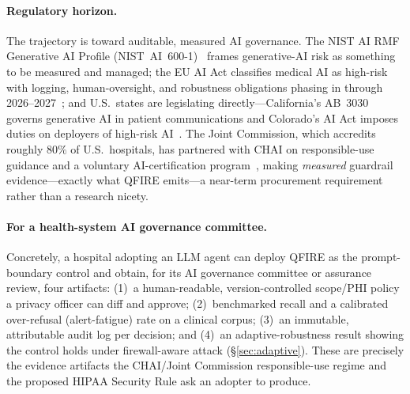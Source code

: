 \documentclass[11pt]{article}
\newcommand{\rev}[1]{#1}
\begin{document}
\paragraph{\rev{Regulatory horizon.}}
\rev{The trajectory is toward auditable, measured AI governance. The NIST AI RMF
Generative AI Profile (NIST~AI~600-1)~\cite{nist_genai2024} frames generative-AI
risk as something to be measured and managed; the EU AI Act classifies medical AI
as high-risk with logging, human-oversight, and robustness obligations phasing in
through 2026--2027~\cite{eu_ai_act2024}; and U.S.\ states are legislating
directly---California's AB~3030 governs generative AI in patient communications
and Colorado's AI Act imposes duties on deployers of high-risk
AI~\cite{ca_ab3030,co_ai_act}. The Joint Commission, which accredits roughly
$80\%$ of U.S.\ hospitals, has partnered with CHAI on responsible-use guidance and
a voluntary AI-certification program~\cite{chai_jc_ruaih2025}, making
\emph{measured} guardrail evidence---exactly what QFIRE emits---a near-term
procurement requirement rather than a research nicety.}

\paragraph{\rev{For a health-system AI governance committee.}}
\rev{Concretely, a hospital adopting an LLM agent can deploy QFIRE as the
prompt-boundary control and obtain, for its AI governance committee or assurance
review, four artifacts: (1)~a human-readable, version-controlled scope/PHI policy
a privacy officer can diff and approve; (2)~benchmarked recall and a calibrated
over-refusal (alert-fatigue) rate on a clinical corpus; (3)~an immutable,
attributable audit log per decision; and (4)~an adaptive-robustness result
showing the control holds under firewall-aware attack (\S\ref{sec:adaptive}).
These are precisely the evidence artifacts the CHAI/Joint Commission
responsible-use regime and the proposed HIPAA Security Rule ask an adopter to
produce.}
\end{document}
